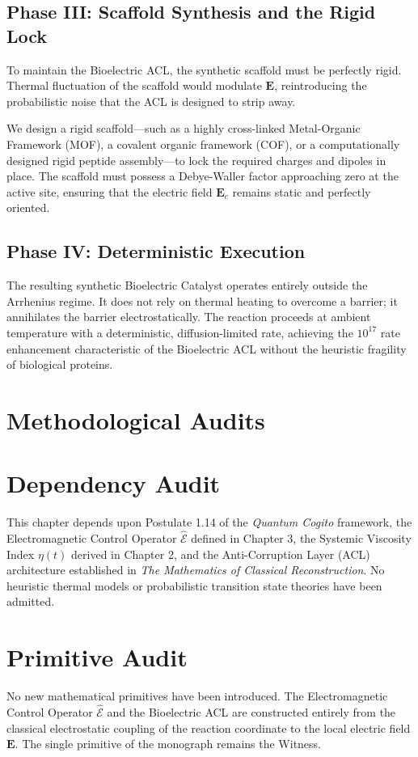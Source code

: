 \documentclass[11pt,openany]{extbook}
\newenvironment{dependencyaudit}{\section*{Dependency Audit}}{}
\newenvironment{primitiveaudit}{\section*{Primitive Audit}}{}
\theoremstyle{plain}
\theoremstyle{definition}
\begin{document}
\subsection{Phase III: Scaffold Synthesis and the Rigid Lock}
To maintain the Bioelectric ACL, the synthetic scaffold must be perfectly rigid. Thermal fluctuation of the scaffold would modulate $\mathbf{E}$, reintroducing the probabilistic noise that the ACL is designed to strip away.

We design a rigid scaffold---such as a highly cross-linked Metal-Organic Framework (MOF), a covalent organic framework (COF), or a computationally designed rigid peptide assembly---to lock the required charges and dipoles in place. The scaffold must possess a Debye-Waller factor approaching zero at the active site, ensuring that the electric field $\mathbf{E}_c$ remains static and perfectly oriented.

\subsection{Phase IV: Deterministic Execution}
The resulting synthetic Bioelectric Catalyst operates entirely outside the Arrhenius regime. It does not rely on thermal heating to overcome a barrier; it annihilates the barrier electrostatically. The reaction proceeds at ambient temperature with a deterministic, diffusion-limited rate, achieving the $10^{17}$ rate enhancement characteristic of the Bioelectric ACL without the heuristic fragility of biological proteins.

\section{Methodological Audits}

\begin{dependencyaudit}
This chapter depends upon Postulate 1.14 of the \emph{Quantum Cogito} framework, the Electromagnetic Control Operator $\hat{\mathcal{E}}$ defined in Chapter 3, the Systemic Viscosity Index $\eta(t)$ derived in Chapter 2, and the Anti-Corruption Layer (ACL) architecture established in \emph{The Mathematics of Classical Reconstruction}. No heuristic thermal models or probabilistic transition state theories have been admitted.
\end{dependencyaudit}

\begin{primitiveaudit}
No new mathematical primitives have been introduced. The Electromagnetic Control Operator $\hat{\mathcal{E}}$ and the Bioelectric ACL are constructed entirely from the classical electrostatic coupling of the reaction coordinate to the local electric field $\mathbf{E}$. The single primitive of the monograph remains the Witness.
\end{primitiveaudit}
\end{document}
